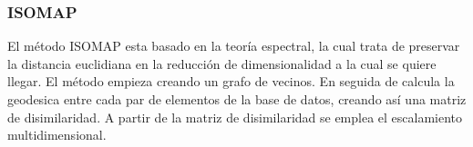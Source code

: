 \subsubsection{ISOMAP}

El método ISOMAP esta basado en la teoría espectral, la cual trata de preservar la distancia euclidiana en la reducción de dimensionalidad a la cual se quiere llegar. El método empieza creando un grafo de vecinos. En seguida de calcula la geodesica entre cada par de elementos de la base de datos, creando así una matriz de disimilaridad. A partir de la matriz de disimilaridad se emplea el escalamiento multidimensional.